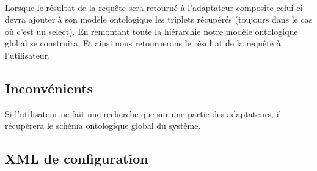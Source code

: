 \documentclass[12pt]{article}
\begin{document}
\\ Lorsque le résultat de la requête sera retourné à l'adaptateur-composite celui-ci devra ajouter à son modèle ontologique les triplets récupérés (toujours dans le cas où c'est un select). En remontant toute la hiérarchie notre modèle ontologique global se construira. Et ainsi nous retournerons le résultat de la requête à l'utilisateur.

\subsection{Inconvénients}

Si l'utilisateur ne fait une recherche que sur une partie des adaptateurs, il récupèrera le schéma ontologique global du système.

\subsection{XML de configuration}
\end{document}
